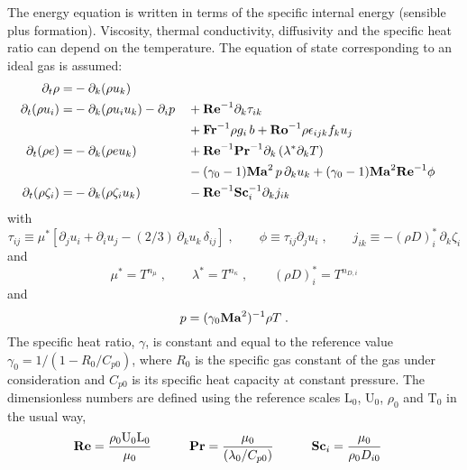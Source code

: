 The energy equation is written in terms of the specific internal energy (sensible plus formation). Viscosity, thermal conductivity, diffusivity and the specific heat ratio can depend on the temperature. The equation of state corresponding to an ideal gas is assumed:
\begin{subequations}
  \begin{align}
    \partial_t \rho       =& -\partial_k (\rho u_k)                                       \\
    \partial_t (\rho u_i) =& -\partial_k (\rho u_i u_k )- \partial_i p
    && +\mathrm{\bf Re}^{-1}\partial_k \tau_{ik}                                            \nonumber \\
    & && +\mathrm{\bf Fr}^{-1} \rho g_i\,b +\mathrm{\bf Ro}^{-1}\rho\epsilon_{ijk} f_ku_j                         \\
    \partial_t (\rho e)   =& -\partial_k (\rho e u_k )
    && +\mathrm{\bf Re}^{-1}\mathrm{\bf Pr}^{-1} \partial_k \left(\lambda^{*}\partial_kT\right)         \nonumber \\
    & &&-(\gamma_0-1)\mathrm{\bf Ma}^2\,p\, \partial_k u_k  + (\gamma_0-1)\mathrm{\bf Ma}^2\mathrm{\bf Re}^{-1}\phi           \\
    \partial_t (\rho \zeta_i) =& -\partial_k (\rho \zeta_i u_k)
    && -\mathrm{\bf Re}^{-1}\mathrm{\bf Sc}_i^{-1} \partial_k j_{ik}
  \end{align}
\end{subequations}
with
\begin{equation}
  \tau_{ij} \equiv \mu^*\left[\partial_j u_i +\partial_i u_j -(2/3)\, \partial_k u_k\,\delta_{ij}\right]\;,\qquad
  \phi      \equiv \tau_{ij} \partial_j u_i\;,\qquad
  j_{ik}    \equiv -(\rho D)_i^{*}\, \partial_k \zeta_i
\end{equation}
and
\begin{equation}
  \mu^{*} =  T^{n_\mu}\;,\qquad \lambda^{*} = T^{n_\kappa} \;,\qquad (\rho D)_i^{*}  =  T^{n_{D,i}}
\end{equation}
and
\begin{equation}
  p  = (\gamma_0 \mathrm{\bf Ma}^2)^{-1}\rho T \;.
  \label{eq:state}
\end{equation}
The specific heat ratio, $\gamma$, is constant and equal to the reference value $\gamma_0=1/(1-R_0/C_{p0})$, where $R_0$ is the specific gas constant of the gas under consideration and $C_{p0}$ is its specific heat capacity at constant pressure. The dimensionless numbers are defined using the reference scales $\mathrm{L}_0$, $\mathrm{U}_0$, $\rho_0$ and $\mathrm{T}_0$ in the usual way,
\begin{alignat*}{3}
  \mathrm{\bf Re} & = \frac{\rho_0 \mathrm{U}_0 \mathrm{L}_0}{\mu_0} & \qquad
  \mathrm{\bf Pr} & = \frac{\mu_0}{(\lambda_0/C_{p0})} & \qquad
  \mathrm{\bf Sc}_i & = \frac{\mu_0}{\rho_0 D_{i0}}
\end{alignat*}
